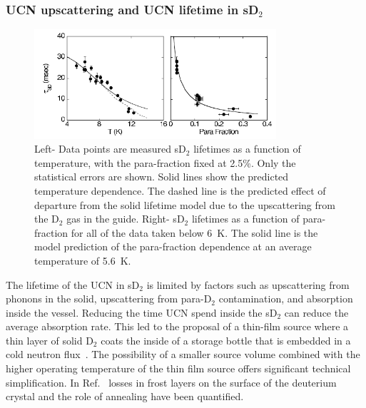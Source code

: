 \subsubsection{UCN upscattering and UCN lifetime in sD$_2$}




\begin{figure}[h!]
\begin{center}
  \includegraphics[width=0.8\textwidth]{Morris2002.PNG} \caption{\cite{Morris2002}
    Left- Data points are measured sD$_2$ lifetimes as a function of
    temperature, with the para-fraction fixed at 2.5\%. Only the
    statistical errors are shown. Solid lines show the predicted
    temperature dependence. The dashed line is the predicted effect of
    departure from the solid lifetime model due to the upscattering
    from the D$_2$ gas in the guide. Right- sD$_2$ lifetimes as a
    function of para-fraction for all of the data taken below 6~K. The
    solid line is the model prediction of the para-fraction dependence
    at an average temperature of 5.6~K.  }
    \label{fig:Morris2002}
    \end{center}
\end{figure} 

The lifetime of the UCN in sD$_2$ is limited by factors such as
upscattering from phonons in the solid, upscattering from para-D$_2$
contamination, and absorption inside the vessel.  Reducing the time
UCN spend inside the sD$_2$ can reduce the average absorption
rate. This led to the proposal of a thin-film source where a thin
layer of solid D$_2$ coats the inside of a storage bottle that is
embedded in a cold neutron flux~\cite{Golub83}. The possibility of a
smaller source volume combined with the higher operating temperature
of the thin film source offers significant technical
simplification. In Ref.~\cite{anghel2018solid} losses in frost layers
on the surface of the deuterium crystal and the role of annealing have
been quantified.

